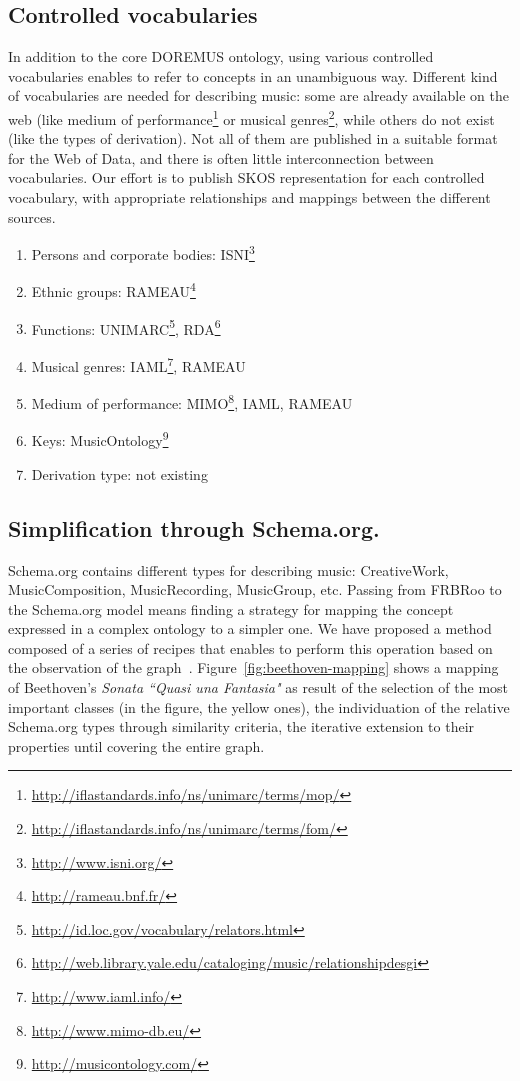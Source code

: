 \documentclass{llncs}
\begin{document}
\subsection{Controlled vocabularies}
In addition to the core DOREMUS ontology, using various controlled vocabularies enables to refer to concepts in an unambiguous way. Different kind of vocabularies are needed for describing music: some are already available on the web (like medium of performance\footnote{\url{http://iflastandards.info/ns/unimarc/terms/mop/}} or musical genres\footnote{\url{http://iflastandards.info/ns/unimarc/terms/fom/}}, while others do not exist (like the types of derivation). Not all of them are published in a suitable format for the Web of Data, and there is often little interconnection between vocabularies. Our effort is to publish SKOS representation for each controlled vocabulary, with appropriate relationships and mappings between the different sources.
\begin{enumerate}
 \item{Persons and corporate bodies: ISNI\footnote{\url{http://www.isni.org/}}}
 \item{Ethnic groups: RAMEAU\footnote{\url{http://rameau.bnf.fr/}}}
 \item{Functions: UNIMARC\footnote{\url{http://id.loc.gov/vocabulary/relators.html}}, RDA\footnote{\url{http://web.library.yale.edu/cataloging/music/relationshipdesgi}}}
 \item{Musical genres: IAML\footnote{\url{http://www.iaml.info/}}, RAMEAU}
 \item{Medium of performance: MIMO\footnote{\url{http://www.mimo-db.eu/}}, IAML, RAMEAU}
 \item{Keys: MusicOntology\footnote{\url{http://musicontology.com/}}}
 \item{Derivation type: not existing}
\end{enumerate}

\subsection{Simplification through Schema.org.}
Schema.org contains different types for describing music: CreativeWork, MusicComposition, MusicRecording, MusicGroup, etc. Passing from FRBRoo to the Schema.org model means finding a strategy for mapping the concept expressed in a complex ontology to a simpler one. We have proposed a method composed of a series of recipes that enables to perform this operation based on the observation of the graph~\cite{lisena2016mapping}. Figure~\ref{fig:beethoven-mapping} shows a mapping of Beethoven's \textit{Sonata ``Quasi una Fantasia"} as result of the selection of the most important classes (in the figure, the yellow ones), the individuation of the relative Schema.org types through similarity criteria, the iterative extension to their properties until covering the entire graph.
\end{document}
